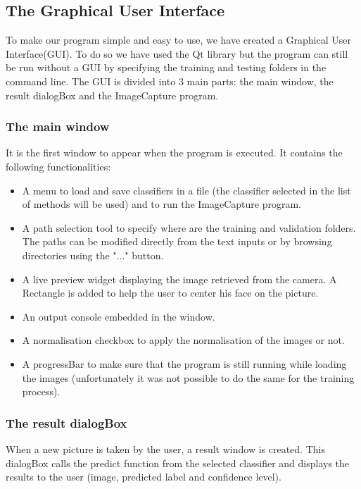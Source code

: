 \subsection{The Graphical User Interface}

To make our program simple and easy to use, we have created a Graphical User Interface(GUI). To do so we have used the Qt library but the program can 
still be run without a GUI by specifying the training and testing folders in the command line.
The GUI is divided into 3 main parts: the main window, the result dialogBox and the ImageCapture program.

\subsubsection{The main window}

It is the first window to appear when the program is executed. It contains the following functionalities:
\begin{itemize}
 \item A menu to load and save classifiers in a file (the classifier selected in the list of methods will be used) and to run the ImageCapture 
program.

\item A path selection tool to specify where are the training and validation folders. The paths can be modified directly from the text inputs or 
by browsing directories using the "..." button.

\item A live preview widget displaying the image retrieved from the camera. A Rectangle is added to help the user to center his face on the 
picture.
\item An output console embedded in the window.
\item A normalisation checkbox to apply the normalisation of the images or not.
\item A progressBar to make sure that the program is still running while loading the images (unfortunately it was not possible to do the same for the 
training process).
\end{itemize}

\subsubsection{The result dialogBox}
When a new picture is taken by the user, a result window is created. This dialogBox calls the predict function from the selected classifier and 
displays the results to the user (image, predicted label and confidence level).

